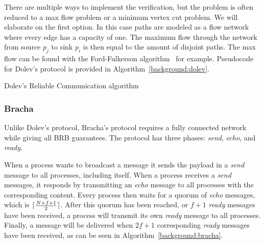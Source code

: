There are multiple ways to implement the verification, but the problem is often reduced to a max flow problem or a minimum vertex cut problem.  We will elaborate on the first option. In this case paths are modeled as a flow network where every edge has a capacity of one. The maximum flow through the network from source $p_j$ to sink $p_i$ is then equal to the amount of disjoint paths. The max flow can be found with the Ford-Fulkerson algorithm~\cite{ford_fulkerson} for example. 
Pseudocode for Dolev's protocol is provided in Algorithm~\ref{background:dolev}.

\begin{algorithm}
  \DontPrintSemicolon
  
  
 \caption{Dolev's Reliable Communication algorithm}
 \label{background:dolev}
\end{algorithm}

\subsubsection{Bracha}
Unlike Dolev's protocol, Bracha's protocol requires a fully connected network while giving all BRB guarantees.  The protocol has three phases: \textit{send}, \textit{echo}, and \textit{ready}.

When a process wants to broadcast a message it sends the payload in a \textit{send} message to all processes, including itself. When a process receives a \textit{send} messages, it responds by transmitting an \textit{echo} message to all processes with the corresponding content. Every process then waits for a quorum of \textit{echo} messages, which is $\lceil\frac{N+f+1}{2}\rceil$. 
After this quorum has been reached, or $f+1$ \textit{ready} messages have been received, a process will transmit its own \textit{ready} message to all processes. Finally, a message will be delivered when $2f+1$ corresponding \textit{ready} messages have been received, as can be seen in Algorithm~\ref{background:bracha}.

